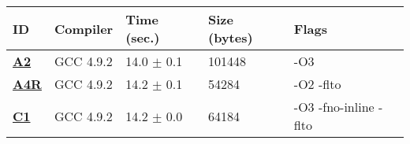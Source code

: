     \begin{tabular}{|l|l|l|l|p{3.2in}|}
     \hline
      \textbf{ID} & \textbf{Compiler} & \textbf{Time (sec.)} & \textbf{Size (bytes)} & \textbf{Flags} \\ 
     \hline
      \textbf{ \href{http://cknowledge.org/repo/web.php?wcid=experiment:21f631290c7846ee\&subpoint=b3d50b1184e6ebed}{A2} } &  GCC 4.9.2  &  14.0 $\pm$ 0.1  &  101448  & {\small -O3 }\\
     \hline
      \textbf{ \href{http://cknowledge.org/repo/web.php?wcid=experiment:85a9d07941d187e4\&subpoint=c59cc63440c795a7}{A4R} } &  GCC 4.9.2  &  14.2 $\pm$ 0.1  &  54284  & {\small -O2 -flto }\\
     \hline
      \textbf{ \href{http://cknowledge.org/repo/web.php?wcid=experiment:872541a6bf29037e\&subpoint=f9fa9a3effb5c863}{C1} } &  GCC 4.9.2  &  14.2 $\pm$ 0.0  &  64184  & {\small -O3 -fno-inline -flto }\\
     \hline
    \end{tabular}    